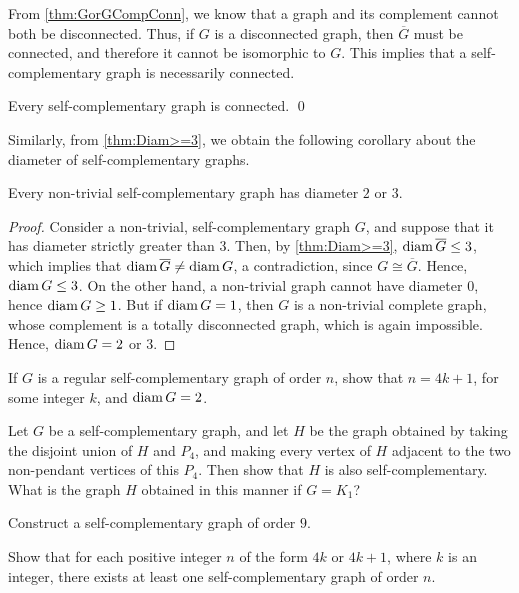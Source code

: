 From \cref{thm:GorGCompConn}, we know that a graph and its complement cannot both be disconnected. Thus, if $G$ is a disconnected graph, then $\overline G$ must be connected, and therefore it cannot be isomorphic to $G$. This implies that a self-complementary graph is necessarily connected.

\begin{Corollary}\label{cor:SCConn}
Every self-complementary graph is connected. \qed
\end{Corollary}

Similarly, from \cref{thm:Diam>=3}, we obtain the following corollary about the diameter of self-complementary graphs.

\begin{Corollary}
Every non-trivial self-complementary graph has diameter $2$ or $3$.
\end{Corollary}

\begin{proof}
Consider a non-trivial, self-complementary graph $G$, and suppose that it has diameter strictly greater than $3$. Then, by \cref{thm:Diam>=3}, $\operatorname{diam} \overline G \le 3$, which implies that $\operatorname{diam} \overline G \ne \operatorname{diam} G$, a contradiction, since $G \cong \overline G$. Hence, $\operatorname{diam} G \le 3$. On the other hand, a non-trivial graph cannot have diameter $0$, hence $\operatorname{diam} G \ge 1$. But if $\operatorname{diam} G = 1$, then $G$ is a non-trivial complete graph, whose complement is a totally disconnected graph, which is again impossible. Hence, $\operatorname{diam} G = 2$ or $3$.
\end{proof}

\begin{Exercise}
If $G$ is a regular self-complementary graph of order $n$, show that $n = 4k + 1$, for some integer $k$, and $\operatorname{diam} G = 2$.
\end{Exercise}

\begin{Exercise}
Let $G$ be a self-complementary graph, and let $H$ be the graph obtained by taking the disjoint union of $H$ and $P_4$, and making every vertex of $H$ adjacent to the two non-pendant vertices of this $P_4$. Then show that $H$ is also self-complementary. What is the graph $H$ obtained in this manner if $G = K_1$?
\end{Exercise}

\begin{Exercise}
Construct a self-complementary graph of order $9$.
\end{Exercise}

\begin{Exercise}
Show that for each positive integer $n$ of the form $4k$ or $4k + 1$, where $k$ is an integer, there exists at least one self-complementary graph of order $n$.
\end{Exercise}



